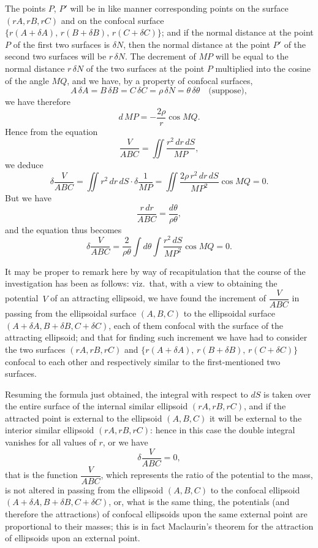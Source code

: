 \documentclass[11pt,a4paper]{book}
\begin{document}
\medskip

The points $P$, $P'$ will be in like manner corresponding points on the surface
$(rA, rB, rC)$ and on the confocal surface $\{r(A+\delta A),\, r(B+\delta B),\, r(C+\delta C)\}$;
and if the normal distance at the point $P$ of the first two surfaces is $\delta N$, then
the normal distance at the point $P'$ of the second two surfaces will be $r\,\delta N$.
The decrement of $MP$ will be equal to the normal distance $r\,\delta N$ of the two
surfaces at the point $P$ multiplied into the cosine of the angle $MQ$, and we have,
by a property of confocal surfaces,
\[
A\,\delta A = B\,\delta B = C\,\delta C = \rho\,\delta N = \theta\,\delta\theta \quad\text{(suppose)},
\]
we have therefore
\[
d\,MP = -\frac{2\rho}{r}\cos MQ.
\]
Hence from the equation
\[
\frac{V}{ABC} = \iint \frac{r^2\,dr\,dS}{MP},
\]
we deduce
\[
\delta\frac{V}{ABC} = \iint r^2\,dr\,dS \cdot \delta\frac{1}{MP}
= \iint \frac{2\rho\,r^2\,dr\,dS}{MP^2}\cos MQ = 0.
\]
But we have
\[
\frac{r\,dr}{ABC} = \frac{d\theta}{\rho\theta},
\]
and the equation thus becomes
\[
\delta\frac{V}{ABC} = \frac{2}{\rho\theta}\int d\theta \int \frac{r^2\,dS}{MP^2}\cos MQ = 0.
\]

It may be proper to remark here by way of recapitulation that the course of the
investigation has been as follows: viz.\ that, with a view to obtaining the potential~$V$
of an attracting ellipsoid, we have found the increment of $\dfrac{V}{ABC}$ in passing from the
ellipsoidal surface $(A, B, C)$ to the ellipsoidal surface $(A+\delta A, B+\delta B, C+\delta C)$,
each of them confocal with the surface of the attracting ellipsoid; and that for finding
such increment we have had to consider the two surfaces $(rA, rB, rC)$ and
$\{r(A+\delta A),\, r(B+\delta B),\, r(C+\delta C)\}$ confocal to each other and respectively
similar to the first-mentioned two surfaces.

Resuming the formula just obtained, the integral with respect to $dS$ is taken
over the entire surface of the internal similar ellipsoid $(rA, rB, rC)$, and if the
attracted point is external to the ellipsoid $(A, B, C)$ it will be external to the
interior similar ellipsoid $(rA, rB, rC)$: hence in this case the double integral vanishes
for all values of $r$, or we have
\[
\delta\frac{V}{ABC} = 0,
\]
that is the function $\dfrac{V}{ABC}$, which represents the ratio of the potential to the mass,
is not altered in passing from the ellipsoid $(A, B, C)$ to the confocal ellipsoid
$(A + \delta A, B + \delta B, C + \delta C)$, or, what is the same thing, the potentials (and therefore
the attractions) of confocal ellipsoids upon the same external point are proportional
to their masses; this is in fact Maclaurin's theorem for the attraction of ellipsoids
upon an external point.
\end{document}

